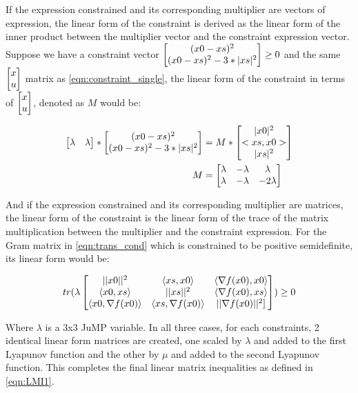If the expression constrained and its corresponding multiplier are vectors of expression, the linear form of the constraint is derived as the linear form of the inner product between the multiplier vector and the constraint expression vector. Suppose we have a constraint vector $\begin{bmatrix}(x0-xs)^2 \\ (x0-xs)^2-3*|xs|^2\end{bmatrix} \geq 0$ and the same $\begin{bmatrix}x\\ u\end{bmatrix}$ matrix as \eqref{eqn:constraint_single}, the linear form of the constraint in terms of $\begin{bmatrix}x\\ u\end{bmatrix}$, denoted as $M$ would be:

\begin{subequations} \label{eqn:constraint_vector}
	\begin{align}
    \begin{bmatrix}\lambda  & \lambda \end{bmatrix} * \begin{bmatrix}(x0 - xs)^2 \\ (x0 - xs)^2-3*|xs|^2\end{bmatrix} &= M * \begin{bmatrix}|x0|^2\\ <xs, x0>\\ |xs|^2\end{bmatrix} \label{eq_cons_vector1}       \\
	M &= \begin{bmatrix}\lambda & -\lambda & \lambda \\ \lambda & -\lambda & -2\lambda\end{bmatrix} \label{eq_cons_vector2}
	\end{align}
\end{subequations}

And if the expression constrained and its corresponding multiplier are matrices, the linear form of the constraint is the linear form of the trace of the matrix multiplication between the multiplier and the constraint expression. For the Gram matrix in \eqref{eqn:trans_cond} which is constrained to be positive semidefinite, its linear form would be:

\begin{equation} \label{eqn:trans_cond}
	tr(\lambda \begin{bmatrix}||x0||^2 & \langle xs, x0 \rangle & \langle \nabla f(x0), x0 \rangle \\ \langle x0, xs \rangle & ||xs||^2 & \langle \nabla f(x0), xs \rangle \\ \langle x0, \nabla f(x0) \rangle & \langle xs, \nabla f(x0) \rangle & ||\nabla f(x0)||^2]\end{bmatrix}) \geq 0	
\end{equation}

Where $\lambda $ is a 3x3 JuMP variable. In all three cases, for each constraints, 2 identical linear form matrices are created, one scaled by \texttt{$\lambda$} and added to the first Lyapunov function and the other by \texttt{$\mu$} and added to the second Lyapunov function. This completes the final linear matrix inequalities as defined in \eqref{eqn:LMI1}.

